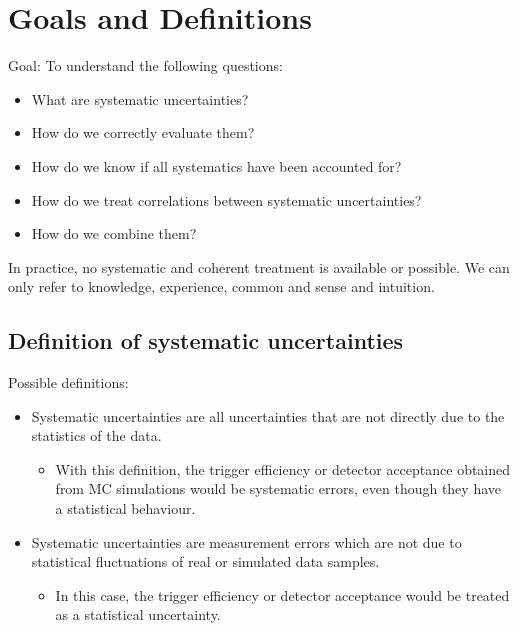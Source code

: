 \section{Goals and Definitions}
Goal: To understand the following questions: 
\begin{itemize}[$-$]
  \item What are systematic uncertainties?
  \item How do we correctly evaluate them?
  \item How do we know if all systematics have been accounted for?
  \item How do we treat correlations between systematic uncertainties?
  \item How do we combine them?
\end{itemize}

In practice, no systematic and coherent treatment is available or possible. We can only refer to knowledge, experience, common and sense and intuition. 

\subsection{Definition of systematic uncertainties}
Possible definitions:
\begin{itemize}
  \item Systematic uncertainties are all uncertainties that are not directly due to the statistics of the data. 
    \begin{itemize}[$\to$]
      \item With this definition, the trigger efficiency or detector acceptance obtained from MC simulations would be systematic errors, even though they have a statistical behaviour.
    \end{itemize}
  \item Systematic uncertainties are measurement errors which are not due to statistical fluctuations of real or simulated data samples.
    \begin{itemize}[$\to$]
      \item In this case, the trigger efficiency or detector acceptance would be treated as a statistical uncertainty. 
    \end{itemize}
\end{itemize}
